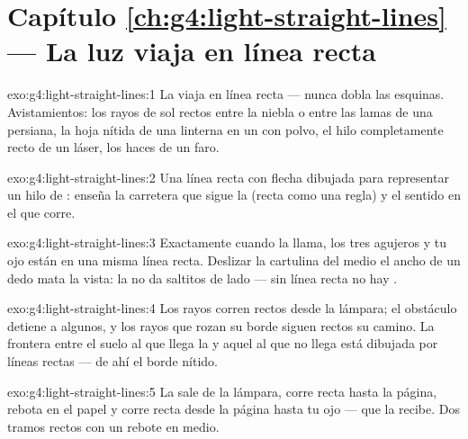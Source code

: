 \section*{Capítulo \ref{ch:g4:light-straight-lines} --- La luz viaja en línea recta}

\begin{solution}{exo:g4:light-straight-lines:1}
La  viaja en línea recta --- nunca dobla las esquinas.
Avistamientos: los rayos de sol rectos entre la niebla o entre las
lamas de una persiana, la hoja nítida de una linterna en un  con
polvo, el hilo completamente recto de un láser, los haces de un faro.
\end{solution}

\begin{solution}{exo:g4:light-straight-lines:2}
Una línea recta con flecha dibujada para representar un hilo de
: enseña la carretera que sigue la  (recta como una regla)
y el sentido en el que corre.
\end{solution}

\begin{solution}{exo:g4:light-straight-lines:3}
Exactamente cuando la llama, los tres agujeros y tu ojo están en una
misma línea recta. Deslizar la cartulina del medio el ancho de un dedo
mata la vista: la  no da saltitos de lado --- sin línea recta no
hay .
\end{solution}

\begin{solution}{exo:g4:light-straight-lines:4}
Los rayos corren rectos desde la lámpara; el obstáculo detiene a
algunos, y los rayos que rozan su borde siguen rectos su camino. La
frontera entre el suelo al que llega la  y aquel al que no llega
está dibujada por líneas rectas --- de ahí el borde nítido.
\end{solution}

\begin{solution}{exo:g4:light-straight-lines:5}
La  sale de la lámpara, corre recta hasta la página, rebota en
el papel y corre recta desde la página hasta tu ojo --- que la recibe.
Dos tramos rectos con un rebote en medio.
\end{solution}

